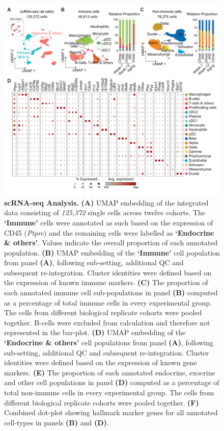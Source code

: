 \begin{figure}[H]
\centering
\includegraphics[width=\linewidth]{Chapter4/Fig/F2-3-01.png}
\caption[res-scR]{\textbf{scRNA-seq Analysis.} \textbf{(A)} UMAP embedding of the integrated data consisting of \textit{125,372} single cells across twelve cohorts. The \textbf{‘Immune’} cells were annotated as such based on the expression of CD45 (\textit{Ptprc}) and the remaining cells were labelled as \textbf{‘Endocrine \& others’}. Values indicate the overall proportion of each annotated population. \textbf{(B)} UMAP embedding of the \textbf{‘Immune’} cell population from panel \textbf{(A)}, following sub-setting, additional QC and subsequent re-integration. Cluster identities were defined based on the expression of known immune markers. \textbf{(C)} The proportion of each annotated immune cell sub-populations in panel \textbf{(B)} computed as a percentage of total immune cells in every experimental group. The cells from different biological replicate cohorts were pooled together. B-cells were excluded from calculation and therefore not represented in the bar-plot. \textbf{(D)} UMAP embedding of the \textbf{‘Endocrine \& others’} cell populations from panel \textbf{(A)}, following sub-setting, additional QC and subsequent re-integration. Cluster identities were defined based on the expression of known gene markers. \textbf{(E)} The proportion of each annotated endocrine, exocrine and other cell populations in panel \textbf{(D)} computed as a percentage of total non-immune cells in every experimental group. The cells from different biological replicate cohorts were pooled together. \textbf{(F)} Combined dot-plot showing hallmark  marker genes for all annotated cell-types in panels \textbf{(B)} and \textbf{(D)}.}
\label{fig:chp2_fullscRNA}
\end{figure}


